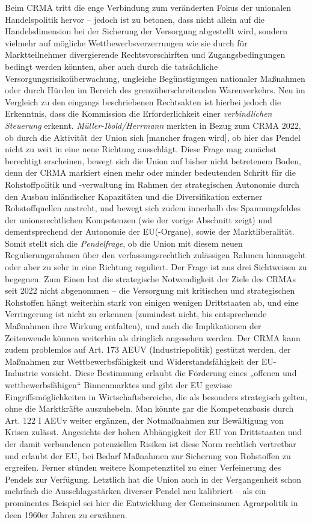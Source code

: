 \documentclass[12pt,a4paper,oneside]{book} %
\begin{document}
Beim CRMA tritt die enge Verbindung zum veränderten Fokus der unionalen Handelspolitik hervor -- jedoch ist zu betonen, dass nicht allein auf die Handelsdimension bei der Sicherung der Versorgung abgestellt wird, sondern vielmehr auf mögliche Wettbewerbsverzerrungen wie sie durch für Marktteilnehmer divergierende Rechtsvorschirften und Zugangsbedingungen bedingt werden könnten, aber auch durch die tatsächliche Versorgungsrisikoüberwachung, ungleiche Begünstigungen nationaler Maßnahmen oder durch Hürden im Bereich des grenzüberschreitenden Warenverkehrs. Neu im Vergleich zu den eingangs beschriebenen Rechtsakten ist hierbei jedoch die Erkenntnis, dass die Kommission die Erforderlichkeit einer \textit{verbindlichen Steuerung} erkennt.\autocite{Schäffer/Hach, ZRP 2023, 207, 208} \textit{Müller-Ibold/Herrmann} merkten in Bezug zum CRMA 2022, ob durch die Aktivität der Union \glqq sich [mancher fragen wird], ob hier das Pendel nicht zu weit in eine neue Richtung ausschlägt\grqq.\autocite{Müller-Ibold/Herrmann, EuZW 2022, 1085, 1091} Diese Frage mag zunächst berechtigt erscheinen, bewegt sich die Union auf bisher nicht betretenem Boden, denn der CRMA markiert einen mehr oder minder bedeutenden Schritt für die Rohstoffpolitik und -verwaltung im Rahmen der strategischen Autonomie durch den Ausbau inländischer Kapazitäten und die Diversifikation externer Rohstoffquellen anstrebt, und bewegt sich zudem innerhalb des Spannungsfeldes der unionsrechtlichen Kompetenzen (wie der vorige Abschnitt zeigt) und dementsprechend der Autonomie der EU(-Organe), sowie der Marktliberalität. Somit stellt sich die \textit{Pendelfrage}, ob die Union mit diesem neuen Regulierungsrahmen über den verfassungsrechtlich zulässigen Rahmen hinausgeht oder aber zu sehr in eine Richtung reguliert. Der Frage ist aus drei Sichtweisen zu begegnen. Zum Einen hat die strategische Notwendigkeit der Ziele des CRMAs seit 2022 nicht abgenommen -- die Versorgung mit kritischen und strategischen Rohstoffen hängt weiterhin stark von einigen wenigen Drittstaaten ab, und eine Verringerung ist nicht zu erkennen (zumindest nicht, bis entsprechende Maßnahmen ihre Wirkung entfalten), und auch die Implikationen der Zeitenwende können weiterhin als dringlich angesehen werden. Der CRMA kann zudem problemlos auf Art. 173 AEUV (Industriepolitik) gestützt werden, der Maßnahmen zur Wettbewerbsfähigkeit und Widerstandsfähigkeit der EU-Industrie vorsieht. Diese Bestimmung erlaubt die Förderung eines „offenen und wettbewerbsfähigen“ Binnenmarktes und gibt der EU gewisse Eingriffsmöglichkeiten in Wirtschaftsbereiche, die als besonders strategisch gelten, ohne die Marktkräfte auszuhebeln. Man könnte gar die Kompetenzbasis durch Art. 122 I AEUv weiter ergänzen, der Notmaßnahmen zur Bewältigung von Krisen zulässt. Angesichts der hohen Abhängigkeit der EU von Drittstaaten und der damit verbundenen potenziellen Risiken ist diese Norm rechtlich vertretbar und erlaubt der EU, bei Bedarf Maßnahmen zur Sicherung von Rohstoffen zu ergreifen. Ferner stünden weitere Kompetenztitel zu einer Verfeinerung des Pendels zur Verfügung. Letztlich hat die Union auch in der Vergangenheit schon mehrfach die Ausschlagsstärken diverser Pendel neu kalibriert -- als ein prominentes Beispiel sei hier die Entwicklung der Gemeinsamen Agrarpolitik in deen 1960er Jahren zu erwähnen.
\end{document}
